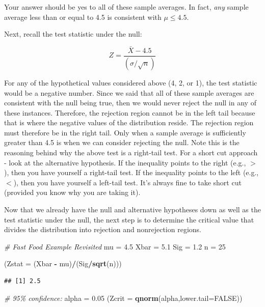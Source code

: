 \documentclass[
]{book}
\newenvironment{Shaded}{\begin{snugshade}}{\end{snugshade}}
\newcommand{\AttributeTok}[1]{\textcolor[rgb]{0.13,0.29,0.53}{#1}}
\newcommand{\CommentTok}[1]{\textcolor[rgb]{0.56,0.35,0.01}{\textit{#1}}}
\newcommand{\ConstantTok}[1]{\textcolor[rgb]{0.56,0.35,0.01}{#1}}
\newcommand{\DecValTok}[1]{\textcolor[rgb]{0.00,0.00,0.81}{#1}}
\newcommand{\FloatTok}[1]{\textcolor[rgb]{0.00,0.00,0.81}{#1}}
\newcommand{\FunctionTok}[1]{\textcolor[rgb]{0.13,0.29,0.53}{\textbf{#1}}}
\newcommand{\NormalTok}[1]{#1}
\newcommand{\OtherTok}[1]{\textcolor[rgb]{0.56,0.35,0.01}{#1}}
\newcommand{\SpecialCharTok}[1]{\textcolor[rgb]{0.81,0.36,0.00}{\textbf{#1}}}
\begin{document}
Your answer should be yes to all of these sample averages. In fact, \emph{any} sample average less than or equal to 4.5 is consistent with \(\mu \leq 4.5\).

Next, recall the test statistic under the null:

\[ Z = \frac{\bar{X}-4.5}{\left(\sigma / \sqrt{n} \right)}\]

For any of the hypothetical values considered above (4, 2, or 1), the test statistic would be a negative number. Since we said that all of these sample averages are consistent with the null being true, then we would never reject the null in any of these instances. Therefore, the rejection region cannot be in the left tail because that is where the negative values of the distribution reside. The rejection region must therefore be in the right tail. Only when a sample average is sufficiently greater than 4.5 is when we can consider rejecting the null. Note this is the reasoning behind why the above test is a right-tail test. For a short cut approach - look at the alternative hypothesis. If the inequality points to the right (e.g., \(>\)), then you have yourself a right-tail test. If the inequality points to the left (e.g., \(<\)), then you have yourself a left-tail test. It's always fine to take short cut (provided you know why you are taking it).

Now that we already have the null and alternative hypotheses down as well as the test statistic under the null, the next step is to determine the critical value that divides the distribution into rejection and nonrejection regions.

\begin{Shaded}
\begin{Highlighting}[]
\CommentTok{\# Fast Food Example Revisited}
\NormalTok{mu }\OtherTok{=} \FloatTok{4.5}
\NormalTok{Xbar }\OtherTok{=} \FloatTok{5.1}
\NormalTok{Sig }\OtherTok{=} \FloatTok{1.2}
\NormalTok{n }\OtherTok{=} \DecValTok{25}

\NormalTok{(}\AttributeTok{Zstat =}\NormalTok{ (Xbar }\SpecialCharTok{{-}}\NormalTok{ mu)}\SpecialCharTok{/}\NormalTok{(Sig}\SpecialCharTok{/}\FunctionTok{sqrt}\NormalTok{(n)))}
\end{Highlighting}
\end{Shaded}

\begin{verbatim}
## [1] 2.5
\end{verbatim}

\begin{Shaded}
\begin{Highlighting}[]
\CommentTok{\# 95\% confidence:}
\NormalTok{alpha }\OtherTok{=} \FloatTok{0.05}
\NormalTok{(}\AttributeTok{Zcrit =} \FunctionTok{qnorm}\NormalTok{(alpha,}\AttributeTok{lower.tail=}\ConstantTok{FALSE}\NormalTok{))}
\end{Highlighting}
\end{Shaded}
\end{document}
